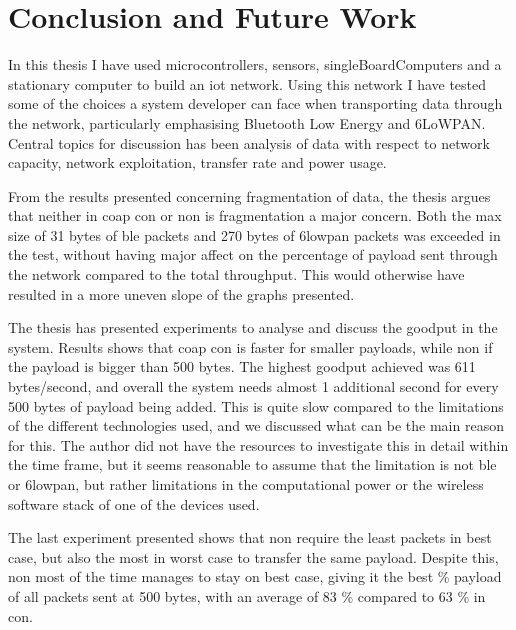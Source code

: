 \chapter{Conclusion and Future Work}
\label{chp:results}



\noindent In this thesis I have used \glspl{microcontroller}, sensors, \glspl{singleBoardComputer} and a stationary computer to build an \gls{iot} network. Using this network I have tested some of the choices a system developer can face when transporting data through the network, particularly emphasising Bluetooth Low Energy and 6LoWPAN. Central topics for discussion has been analysis of data with respect to network capacity, network exploitation, transfer rate and power usage. 

\noindent From the results presented concerning fragmentation of data, the thesis argues that neither in \gls{coap} \gls{con} or \gls{non} is fragmentation a major concern. Both the max size of 31 bytes of \gls{ble} packets and 270 bytes of \gls{6lowpan} packets was exceeded in the test, without having major affect on the percentage of \gls{payload} sent through the network compared to the total \gls{throughput}. This would otherwise have resulted in a more uneven slope of the graphs presented. 

\noindent The thesis has presented experiments to analyse and discuss the \gls{goodput} in the system. Results shows that \gls{coap} \gls{con} is faster for smaller \glspl{payload}, while \gls{non} if the \gls{payload} is bigger than 500 bytes. The highest \gls{goodput} achieved was 611 bytes/second, and overall the system needs almost 1 additional second for every 500 bytes of \gls{payload} being added. This is quite slow compared to the limitations of the different technologies used, and we discussed what can be the main reason for this. The author did not have the resources to investigate this in detail within the time frame, but it seems reasonable to assume that the limitation is not \gls{ble} or \gls{6lowpan}, but rather limitations in the computational power or the wireless software stack of one of the devices used. 

\noindent The last experiment presented shows that \gls{non} require the least packets in best case, but also the most in worst case to transfer the same \gls{payload}. Despite this, \gls{non} most of the time manages to stay on best case, giving it the best \% payload of all packets sent at 500 bytes, with an average of 83 \% compared to 63 \% in \gls{con}.

